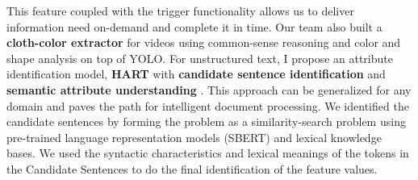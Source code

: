     This feature coupled with the trigger functionality allows us to deliver information need on-demand and complete it in time.
    Our team also built a \textbf{cloth-color extractor} for videos using common-sense reasoning and color and shape analysis \cite{stonebraker2020surveillance} on top of YOLO. 
    For unstructured text, I propose an attribute identification model, \textbf{HART} with \textbf{candidate sentence identification}  and \textbf{semantic attribute understanding}  
    \cite{solaiman2022femmir}. This approach can be generalized for any domain and  paves the path for intelligent document processing. %
    We identified the candidate sentences
    by forming the problem as a similarity-search problem using pre-trained language representation models (SBERT) and
    lexical knowledge bases. We used the syntactic characteristics and lexical meanings of the tokens in the Candidate
    Sentences to do the final identification of the feature values.

